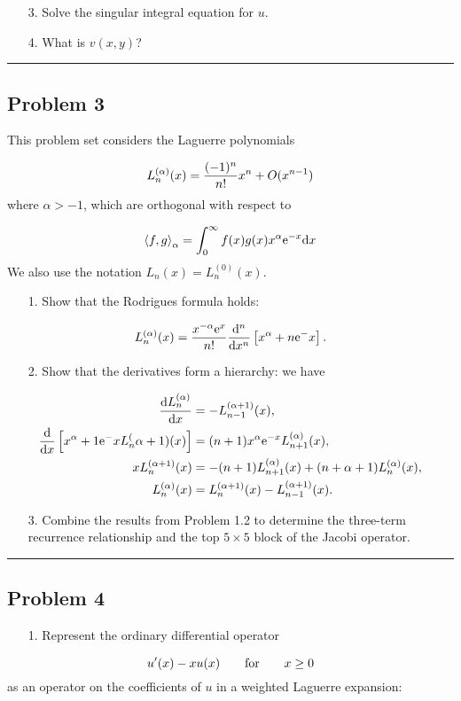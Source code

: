 \documentclass[12pt,a4paper]{article}
\def\qqfor{\qquad\hbox{for}\qquad}
\def\D{ {\rm d} }
\def\E{ {\rm e} }
\def\ip<#1>{\left\langle{#1}\right\rangle}
\def\dx{\D x}
\def\br[#1]{\left[{#1}\right]}
\begin{document}
\begin{itemize}
\item[3. ] Solve the singular integral equation for $u$.


\item[4. ] What is $v(x,y)$?

\end{itemize}
\rule{\textwidth}{1pt}
\subsection{Problem 3}
This problem set considers the Laguerre polynomials

\[
L_n^{(\alpha)}(x) = {(-1)^n \over n! } x^n + O(x^{n-1})
\]
where $\alpha > -1$, which are orthogonal with respect to

\[
\ip<f,g>_\alpha = \int_0^\infty f(x) g(x) x^\alpha \E^{-x}\dx
\]
We also use the notation $L_n(x) = L_n^{(0)}(x)$.

\begin{itemize}
\item[1. ] Show that the Rodrigues formula holds:

\end{itemize}
\[
L_n^{(\alpha)}(x) = {x^{-\alpha} \E^x \over n!} {\D^n \over \dx^n}\br[x^{\alpha+n}\E^{-x}].
\]
\begin{itemize}
\item[2. ] Show that the derivatives form a hierarchy: we have

\end{itemize}

\begin{align*}
{\D L_n^{(\alpha)} \over \dx} & = -L_{n-1}^{(\alpha+1)}(x), \\
{\D \over \dx}\br[x^{\alpha+1} \E^{-x} L_n^{(\alpha+1)}(x) ]  &= (n+1)x^{\alpha} \E^{-x}L_{n+1}^{(\alpha)}(x), \\
x L_n^{(\alpha+1)}(x) &= -(n+1)L_{n+1}^{(\alpha)}(x) + (n+\alpha+1)L_n^{(\alpha)}(x), \\
L_n^{(\alpha)}(x) &= L_n^{(\alpha+1)}(x) - L_{n-1}^{(\alpha +1)}(x).
\end{align*}
\begin{itemize}
\item[3. ] Combine the results from Problem 1.2 to determine the three-term recurrence relationship and the  top $5 \times 5$ block of the Jacobi operator.

\end{itemize}
\rule{\textwidth}{1pt}
\subsection{Problem 4}
\begin{itemize}
\item[1. ] Represent the ordinary differential operator

\end{itemize}
\[
u'(x) - x u(x)  \qqfor x \geq 0
\]
as an operator on the coefficients of $u$ in a weighted Laguerre expansion:
\end{document}
